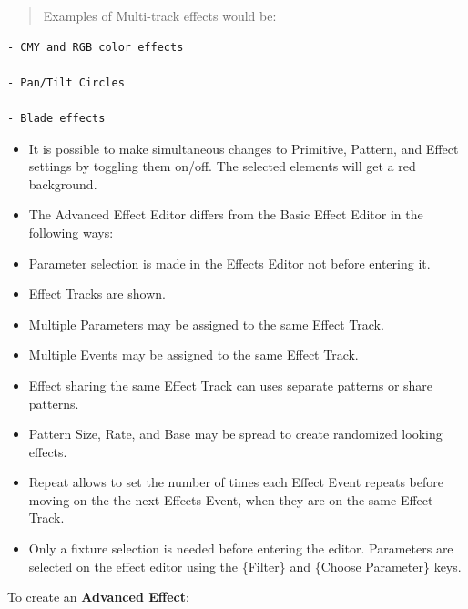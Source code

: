 \documentclass[
]{article}
\providecommand{\tightlist}{%
  \setlength{\itemsep}{0pt}\setlength{\parskip}{0pt}}
\begin{document}
\begin{quote}
Examples of Multi-track effects would be:
\end{quote}

\begin{verbatim}
- CMY and RGB color effects 

- Pan/Tilt Circles 

- Blade effects
\end{verbatim}

\begin{itemize}
\tightlist
\item
  It is possible to make simultaneous changes to Primitive, Pattern, and Effect settings by toggling them on/off. The selected elements will get a red background.
\end{itemize}

\begin{itemize}
\item
  The Advanced Effect Editor differs from the Basic Effect Editor in the following ways:
\item
  Parameter selection is made in the Effects Editor not before entering it.
\item
  Effect Tracks are shown.
\item
  Multiple Parameters may be assigned to the same Effect Track.
\end{itemize}

\begin{itemize}
\tightlist
\item
  Multiple Events may be assigned to the same Effect Track.
\end{itemize}

\begin{itemize}
\item
  Effect sharing the same Effect Track can uses separate patterns or share patterns.
\item
  Pattern Size, Rate, and Base may be spread to create randomized looking effects.
\item
  Repeat allows to set the number of times each Effect Event repeats before moving on the the next Effects Event, when they are on the same Effect Track.
\item
  Only a fixture selection is needed before entering the editor. Parameters are selected on the effect editor using the \{Filter\} and \{Choose Parameter\} keys.
\end{itemize}

To create an \textbf{Advanced Effect}:
\end{document}
